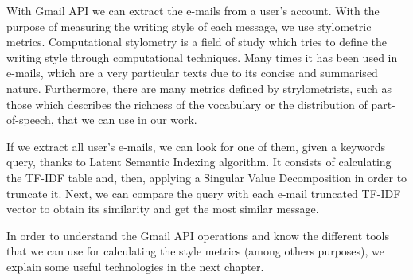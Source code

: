 With Gmail API we can extract the e-mails from a user's account. With the purpose of measuring the writing style of each message, we use stylometric metrics. Computational stylometry is a field of study which tries to define the writing style through computational techniques. Many times it has been used in e-mails, which are a very particular texts due to its concise and summarised nature. Furthermore, there are many metrics defined by strylometrists, such as those which describes the richness of the vocabulary or the distribution of part-of-speech, that we can use in our work.

If we extract all user's e-mails, we can look for one of them, given a keywords query, thanks to Latent Semantic Indexing algorithm. It consists of calculating the TF-IDF table and, then, applying a Singular Value Decomposition in order to truncate it. Next, we can compare the query with each e-mail truncated TF-IDF vector to obtain its similarity and get the most similar message.

In order to understand the Gmail API operations and know the different tools that we can use for calculating the style metrics (among others purposes), we explain some useful technologies in the next chapter.


